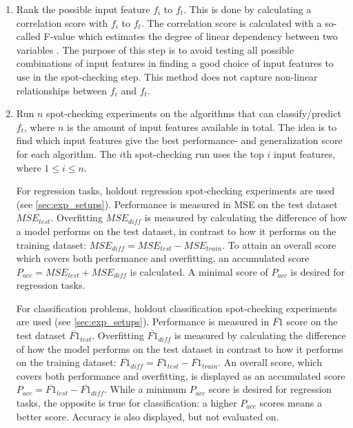 		\begin{enumerate}
			\item Rank the possible input feature $f_i$ to $f_t$. This is done by calculating a correlation score with $f_i$ to $f_t$. The correlation score is calculated with a so-called F-value which estimates the degree of linear dependency between two variables \cite{WEBSITE:28, WEBSITE:29}. The purpose of this step is to avoid testing all possible combinations of input features in finding a good choice of input features to use in the spot-checking step. This method does not capture non-linear relationships between $f_i$ and $f_t$. 

			\item Run $n$ spot-checking experiments on the algorithms that can classify/predict $f_t$, where $n$ is the amount of input features available in total. The idea is to find which input features give the best performance- and generalization score for each algorithm. The $i$th spot-checking run uses the top $i$ input features, where $1 \leq i \leq n$.

				For regression tasks, holdout regression spot-checking experiments are used (see \ref{sec:exp_setups}). Performance is measured in MSE on the test dataset $MSE_{test}$. Overfitting $MSE_{diff}$ is measured by calculating the difference of how a model performs on the test dataset, in contrast to how it performs on the training dataset: $MSE_{diff} = MSE_{test} - MSE_{train}$. To attain an overall score which covers both performance and overfitting, an accumulated score $P_{acc} = MSE_{test} + MSE_{diff}$ is calculated. A minimal score of $P_{acc}$ is desired for regression tasks.

				For classification problems, holdout classification spot-checking experiments are used (see \ref{sec:exp_setups}). Performance is measured in $\overline{F1}$ score on the test dataset $\overline{F1}_{test}$. Overfitting $\overline{F1}_{diff}$ is measured by calculating the difference of how the model performs on the test dataset in contrast to how it performs on the training dataset: $\overline{F1}_{diff} = \overline{F1}_{test} - \overline{F1}_{train}$. An overall score, which covers both performance and overfitting, is displayed as an accumulated score $P_{acc} = \overline{F1}_{test} - \overline{F1}_{diff}$. While a minimum $P_{acc}$ score is desired for regression tasks, the opposite is true for classification: a higher $P_{acc}$ scores means a better score. Accuracy is also displayed, but not evaluated on.


\end{enumerate}
